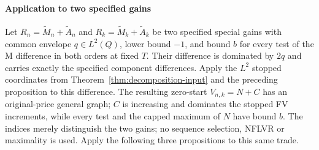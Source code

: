 \paragraph{Application to two specified gains}
Let $R_n=\widetilde M_n+\widetilde A_n$ and $R_k=\widetilde M_k+\widetilde A_k$ be two specified special gains with common envelope $q\in L^2(Q)$,
lower bound $-1$, and bound $b$ for every test of the M difference in both orders at fixed $T$.
Their difference is dominated by $2q$ and carries exactly the specified component differences.
Apply the $L^2$ stopped coordinates from Theorem~\ref{thm:decomposition-input} and the preceding proposition to this difference.
The resulting zero-start $V_{n,k}=N+C$ has an original-price general graph;
$C$ is increasing and dominates the stopped FV increments, while every test and the capped maximum of $N$ have bound $b$.
The indices merely distinguish the two gains; no sequence selection, NFLVR or maximality is used.
Apply the following three propositions to this same trade.

